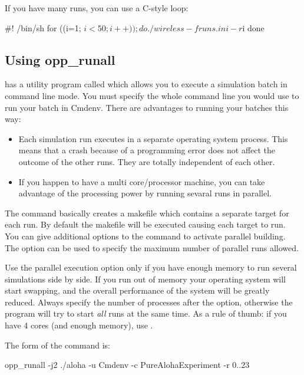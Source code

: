 If you have many runs, you can use a C-style loop:

\begin{filelisting}
#! /bin/sh
for ((i=1; $i<50; i++)); do
   ./wireless -f runs.ini -r $i
done
\end{filelisting}

\subsection{Using opp\_runall}
\label{sec:run-sim:batches-using-opp-runall}

{\opp} has a utility program called  which
allows you to execute a simulation batch in command line mode.
You must specify the whole command line you would use to run
your batch in Cmdenv. There are advantages to running your batches
this way:
\begin{itemize}
  \item Each simulation run executes in a separate operating system process.
        This means that a crash because of a programming error does not affect
        the outcome of the other runs. They are totally independent of each other.
  \item If you happen to have a multi core/processor machine, you can take advantage
        of the processing power by running sevaral runs in parallel.
\end{itemize}

The command basically creates a makefile which contains
a separate target for each run. By default the makefile will be executed causing each
target to run. You can give additional options to the  command to
activate parallel building. The  option can be used to specify the maximum number
of parallel runs allowed.

\begin{warning}
  Use the parallel execution option only if you have enough memory to run several simulations
  side by side. If you run out of memory your operating system will start swapping, and the overall
  performance of the system will be greatly reduced. Always specify the number of processes
  after the  option, otherwise the  program will try to start \textit{all}
  runs at the same time. As a rule of thumb: if you have 4 cores (and enough memory), use .
\end{warning}

The form of the command is:
\begin{commandline}
opp_runall -j2 ./aloha -u Cmdenv -c PureAlohaExperiment -r 0..23
\end{commandline}

